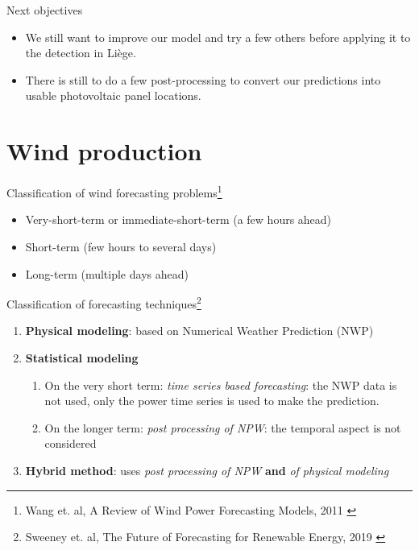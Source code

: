 \documentclass[12pt]{beamer}
\begin{document}
\begin{frame}{Next objectives}
    \begin{itemize}
        \item We still want to improve our model and try a few others before applying it to the detection in Liège.
        \item There is still to do a few post-processing to convert our predictions into usable photovoltaic panel locations.
    \end{itemize}
\end{frame}

\section{Wind production}

\begin{frame}{Classification of wind forecasting problems\footnote{Wang et. al, A Review of Wind Power Forecasting Models, 2011 \cite{wang2011windpower}}}
    \begin{itemize}
        \item Very-short-term or immediate-short-term (a few hours ahead)
        \item \alert<2->{Short-term (few hours to several days)}
        \item Long-term (multiple days ahead)
    \end{itemize}
    
\end{frame}

\begin{frame}{Classification of forecasting techniques\footnote{Sweeney et. al, The Future of Forecasting for Renewable Energy, 2019 \cite{sweeney2019future}}}
    \begin{enumerate}
        \item \textbf{Physical modeling}: based on Numerical Weather Prediction (NWP)
        \item \alert<2->{\textbf{Statistical modeling}}
            \begin{enumerate}
                \item On the very short term: \emph{time series based forecasting}: the NWP data is not used, only the power time series is used to make the prediction.
                \item On the longer term: \alert<2->{\emph{post processing of NPW}}: the temporal aspect is not considered
            \end{enumerate}
        \item \textbf{Hybrid method}: uses \emph{post processing of NPW} \textbf{and} \emph{of physical modeling}
    \end{enumerate}
\end{frame}
\end{document}
